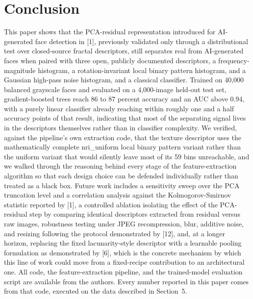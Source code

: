 \documentclass[11pt]{article}
\begin{document}
\section{Conclusion}

This paper shows that the PCA-residual representation introduced for AI-generated face detection in [1], previously validated only through a distributional test over closed-source fractal descriptors, still separates real from AI-generated faces when paired with three open, publicly documented descriptors, a frequency-magnitude histogram, a rotation-invariant local binary pattern histogram, and a Gaussian high-pass noise histogram, and a classical classifier. Trained on 40,000 balanced grayscale faces and evaluated on a 4,000-image held-out test set, gradient-boosted trees reach 86 to 87 percent accuracy and an AUC above 0.94, with a purely linear classifier already reaching within roughly one and a half accuracy points of that result, indicating that most of the separating signal lives in the descriptors themselves rather than in classifier complexity. We verified, against the pipeline's own extraction code, that the texture descriptor uses the mathematically complete nri\_uniform local binary pattern variant rather than the uniform variant that would silently leave most of its 59 bins unreachable, and we walked through the reasoning behind every stage of the feature-extraction algorithm so that each design choice can be defended individually rather than treated as a black box. Future work includes a sensitivity sweep over the PCA truncation level and a correlation analysis against the Kolmogorov-Smirnov statistic reported by [1], a controlled ablation isolating the effect of the PCA-residual step by comparing identical descriptors extracted from residual versus raw images, robustness testing under JPEG recompression, blur, additive noise, and resizing following the protocol demonstrated by [12], and, at a longer horizon, replacing the fixed lacunarity-style descriptor with a learnable pooling formulation as demonstrated by [6], which is the concrete mechanism by which this line of work could move from a fixed-recipe contribution to an architectural one. All code, the feature-extraction pipeline, and the trained-model evaluation script are available from the authors. Every number reported in this paper comes from that code, executed on the data described in Section~5.
\end{document}
